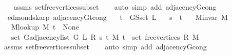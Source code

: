 \begin{isabellebody}
\endisataginvisible
{\isafoldinvisible}%
%
\isadeliminvisible
\isanewline
%
\endisadeliminvisible
%
\isadelimproof
\ \ %
\endisadelimproof
%
\isatagproof
{}\isamarkupfalse%
\ assms\ set{\isacharunderscore}{\kern0pt}free{\isacharunderscore}{\kern0pt}vertices{\isacharunderscore}{\kern0pt}subset\isanewline
\ \ \isamarkupfalse%
\ {\isacharparenleft}{\kern0pt}auto\ simp\ add{\isacharcolon}{\kern0pt}\ adjacency{\isacharunderscore}{\kern0pt}G{}{\isacharunderscore}{\kern0pt}cong{\isacharparenright}{\kern0pt}%
\endisatagproof
{\isafoldproof}%
%
\isadelimproof
\isanewline
%
\endisadelimproof
%
\isadeliminvisible
\isanewline
%
\endisadeliminvisible
%
\isataginvisible
{}\isamarkupfalse%
\ {\isacharparenleft}{\kern0pt}\ edmonds{\isacharunderscore}{\kern0pt}karp{\isacharparenright}{\kern0pt}\ adjacency{\isacharunderscore}{\kern0pt}G{}{\isacharunderscore}{\kern0pt}t{\isacharunderscore}{\kern0pt}cong{\isacharcolon}{\kern0pt}\isanewline
\ \ \ {\isachardoublequoteopen}t\ {\isasymnotin}\ G{\isachardot}{\kern0pt}S{\isachardot}{\kern0pt}set\ L{\isachardoublequoteclose}\isanewline
\ \ \ {\isachardoublequoteopen}s\ {\isasymnoteq}\ t{\isachardoublequoteclose}\isanewline
\ \ \ {\isachardoublequoteopen}M{\isachardot}{\kern0pt}invar\ M{\isachardoublequoteclose}\isanewline
\ \ \ {\isachardoublequoteopen}M{\isacharunderscore}{\kern0pt}lookup\ M\ t\ {\isacharequal}{\kern0pt}\ None{\isachardoublequoteclose}\isanewline
\ \ \ {\isachardoublequoteopen}set\ {\isacharparenleft}{\kern0pt}G{\isachardot}{\kern0pt}adjacency{\isacharunderscore}{\kern0pt}list\ {\isacharparenleft}{\kern0pt}G{}\ L\ R\ s\ t\ M{\isacharparenright}{\kern0pt}\ t{\isacharparenright}{\kern0pt}\ {\isacharequal}{\kern0pt}\ set\ {\isacharparenleft}{\kern0pt}free{\isacharunderscore}{\kern0pt}vertices\ R\ M{\isacharparenright}{\kern0pt}{\isachardoublequoteclose}%
\endisataginvisible
{\isafoldinvisible}%
%
\isadeliminvisible
\isanewline
%
\endisadeliminvisible
%
\isadelimproof
\ \ %
\endisadelimproof
%
\isatagproof
{}\isamarkupfalse%
\ assms\ set{\isacharunderscore}{\kern0pt}free{\isacharunderscore}{\kern0pt}vertices{\isacharunderscore}{\kern0pt}subset\isanewline
\ \ \isamarkupfalse%
\ {\isacharparenleft}{\kern0pt}auto\ simp\ add{\isacharcolon}{\kern0pt}\ adjacency{\isacharunderscore}{\kern0pt}G{}{\isacharunderscore}{\kern0pt}cong{\isacharparenright}{\kern0pt}%
\endisatagproof
{\isafoldproof}%

\end{isabellebody}
